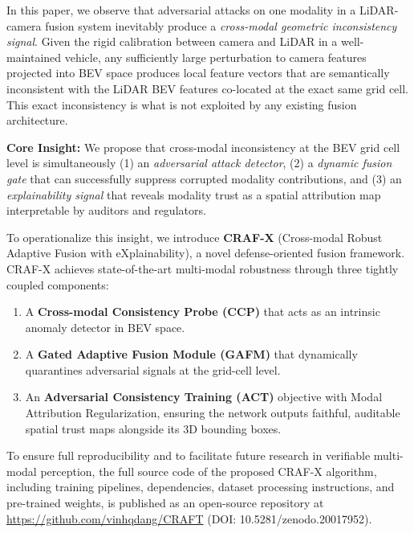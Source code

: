 In this paper, we observe that adversarial attacks on one modality in a LiDAR-camera fusion system inevitably produce a \textit{cross-modal geometric inconsistency signal}. Given the rigid calibration between camera and LiDAR in a well-maintained vehicle, any sufficiently large perturbation to camera features projected into BEV space produces local feature vectors that are semantically inconsistent with the LiDAR BEV features co-located at the exact same grid cell. This exact inconsistency is what is not exploited by any existing fusion architecture.

\textbf{Core Insight:} We propose that cross-modal inconsistency at the BEV grid cell level is simultaneously (1) an \textit{adversarial attack detector}, (2) a \textit{dynamic fusion gate} that can successfully suppress corrupted modality contributions, and (3) an \textit{explainability signal} that reveals modality trust as a spatial attribution map interpretable by auditors and regulators.

To operationalize this insight, we introduce \textbf{CRAF-X} (Cross-modal Robust Adaptive Fusion with eXplainability), a novel defense-oriented fusion framework. CRAF-X achieves state-of-the-art multi-modal robustness through three tightly coupled components:
\begin{enumerate}
    \item A \textbf{Cross-modal Consistency Probe (CCP)} that acts as an intrinsic anomaly detector in BEV space.
    \item A \textbf{Gated Adaptive Fusion Module (GAFM)} that dynamically quarantines adversarial signals at the grid-cell level.
    \item An \textbf{Adversarial Consistency Training (ACT)} objective with Modal Attribution Regularization, ensuring the network outputs faithful, auditable spatial trust maps alongside its 3D bounding boxes.
\end{enumerate}

To ensure full reproducibility and to facilitate future research in verifiable multi-modal perception, the full source code of the proposed CRAF-X algorithm, including training pipelines, dependencies, dataset processing instructions, and pre-trained weights, is published as an open-source repository at \url{https://github.com/vinhqdang/CRAFT} (DOI: 10.5281/zenodo.20017952).
